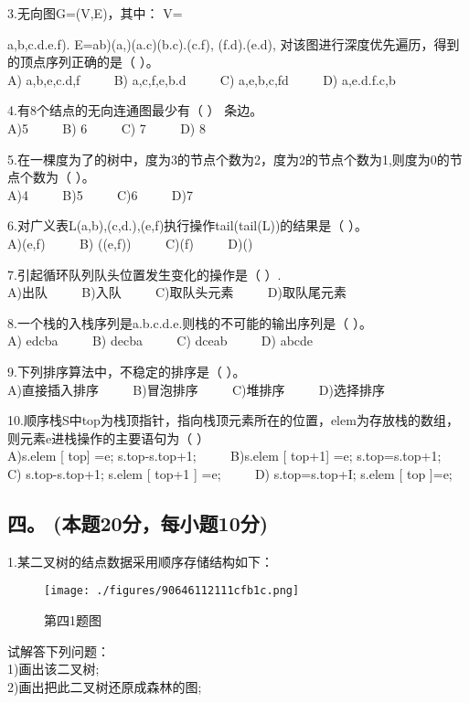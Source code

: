 3.无向图G=(V,E)，其中： V={a,b,c.d.e.f). E={ab)(a,)(a.c)(b.c).(c.f), (f.d).(e.d)}, 对该图进行深度优先遍历，得到的顶点序列正确的是（ ）。 \\
A) a,b,e,c.d,f $\qquad$ B) a,c,f,e,b.d $\qquad$ C) a,e,b,c,fd $\qquad$ D) a,e.d.f.c,b

4.有8个结点的无向连通图最少有（ ） 条边。 \\
A)5 $\qquad$ B) 6 $\qquad$ C) 7 $\qquad$ D) 8

5.在一棵度为了的树中，度为3的节点个数为2，度为2的节点个数为1,则度为0的节点个数为（  ）。 \\
A)4 $\qquad$ B)5 $\qquad$ C)6 $\qquad$ D)7

6.对广义表L(a,b),(c,d.),(e,f)执行操作tail(tail(L))的结果是（  ）。 \\
A)(e,f) $\qquad$ B) ((e,f)) $\qquad$ C)(f) $\qquad$ D)()

7.引起循环队列队头位置发生变化的操作是（ ）. \\
A)出队 $\qquad$ B)入队 $\qquad$ C)取队头元素 $\qquad$ D)取队尾元素

8.一个栈的入栈序列是a.b.c.d.e.则栈的不可能的输出序列是（ ）。 \\
A) edcba $\qquad$ B) decba $\qquad$ C) dceab $\qquad$ D) abcde

9.下列排序算法中，不稳定的排序是（  ）。 \\
A)直接插入排序 $\qquad$ B)冒泡排序 $\qquad$ C)堆排序 $\qquad$ D)选择排序

10.顺序栈S中top为栈顶指针，指向栈顶元素所在的位置，elem为存放栈的数组，则元素e进栈操作的主要语句为（  ） \\
A)s.elem [ top] =e; s.top-s.top+1; $\qquad$ B)s.elem [ top+1] =e; s.top=s.top+1; \\
C) s.top-s.top+1; s.elem [ top+1 ] =e; $\qquad$ D) s.top=s.top+I; s.elem [ top ]=e;

\subsection{四。 (本题20分，每小题10分)}
1.某二叉树的结点数据采用顺序存储结构如下： \\
\begin{figure}[ht]
\centering
\texttt{[image: ./figures/90646112111cfb1c.png]}
\caption{第四1题图} \label{fig_SMDS11_1}
\end{figure}
试解答下列问题： \\
1)画出该二叉树; \\
2)画出把此二叉树还原成森林的图;

}
